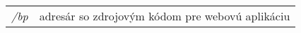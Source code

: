 \begin{tabular}{ll}
\textit{/bp} & adresár so zdrojovým kódom pre webovú aplikáciu \\[5pt]
\end{tabular}